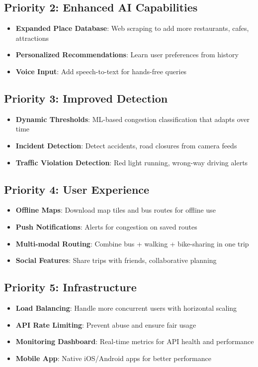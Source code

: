 \subsection{Priority 2: Enhanced AI Capabilities}
\begin{itemize}[noitemsep]
    \item \textbf{Expanded Place Database}: Web scraping to add more restaurants, cafes, attractions
    \item \textbf{Personalized Recommendations}: Learn user preferences from history
    \item \textbf{Voice Input}: Add speech-to-text for hands-free queries
\end{itemize}

\subsection{Priority 3: Improved Detection}
\begin{itemize}[noitemsep]
    \item \textbf{Dynamic Thresholds}: ML-based congestion classification that adapts over time
    \item \textbf{Incident Detection}: Detect accidents, road closures from camera feeds
    \item \textbf{Traffic Violation Detection}: Red light running, wrong-way driving alerts
\end{itemize}

\subsection{Priority 4: User Experience}
\begin{itemize}[noitemsep]
    \item \textbf{Offline Maps}: Download map tiles and bus routes for offline use
    \item \textbf{Push Notifications}: Alerts for congestion on saved routes
    \item \textbf{Multi-modal Routing}: Combine bus + walking + bike-sharing in one trip
    \item \textbf{Social Features}: Share trips with friends, collaborative planning
\end{itemize}

\subsection{Priority 5: Infrastructure}
\begin{itemize}[noitemsep]
    \item \textbf{Load Balancing}: Handle more concurrent users with horizontal scaling
    \item \textbf{API Rate Limiting}: Prevent abuse and ensure fair usage
    \item \textbf{Monitoring Dashboard}: Real-time metrics for API health and performance
    \item \textbf{Mobile App}: Native iOS/Android apps for better performance
\end{itemize}
